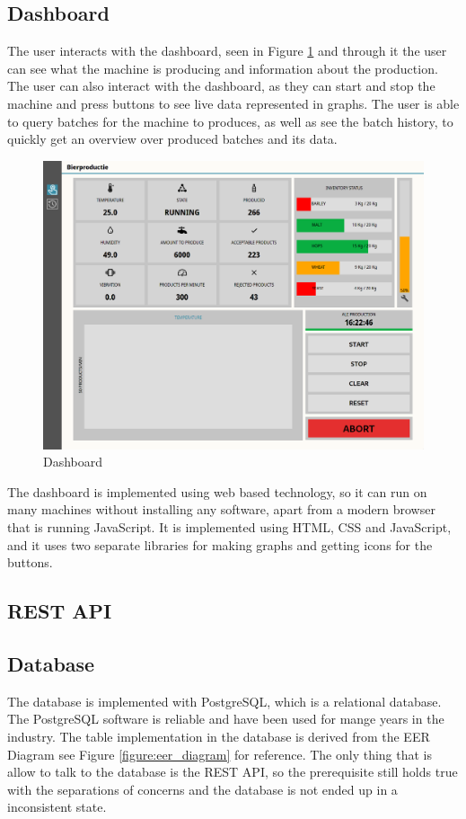 \subsection{Dashboard}
The user interacts with the dashboard, seen in Figure \ref{figure:dashboard} and
through it the user can see what the machine is producing and information about
the production. The user can also interact with the dashboard, as they can start
and stop the machine and press buttons to see live data represented in graphs.
The user is able to query batches for the machine to produces, as well as see
the batch history, to quickly get an overview over produced batches and its data.\\

\begin{figure}[ht]
	\centering
	\includegraphics[width=1\linewidth]{images/dashboard.png}
	\caption{Dashboard}
	\label{figure:dashboard}
\end{figure}

The dashboard is implemented using web based technology, so it can run on many
machines without installing any software, apart from a modern browser that is
running JavaScript. It is implemented using HTML, CSS and JavaScript, and it
uses two separate libraries for making graphs and getting icons for the buttons.

\subsection{REST API}

\subsection{Database}
The database is implemented with PostgreSQL, which is a relational database.
The PostgreSQL software is reliable and have been used for mange years in the
industry. The table implementation in the database is derived from the EER
Diagram see Figure \ref{figure:eer_diagram} for reference. The only thing
that is allow to talk to the database is the REST API, so the prerequisite 
still holds true with the separations of concerns and the database is not ended 
up in a inconsistent state.


